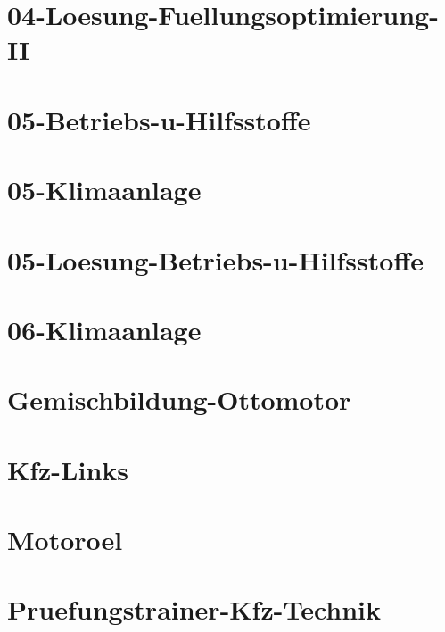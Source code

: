 \chapter{04-Loesung-Fuellungsoptimierung-II}
%
\chapter{05-Betriebs-u-Hilfsstoffe}
%
\chapter{05-Klimaanlage}
%
\chapter{05-Loesung-Betriebs-u-Hilfsstoffe}
%
\chapter{06-Klimaanlage}
%
\chapter{Gemischbildung-Ottomotor}
%
\chapter{Kfz-Links}
%
\chapter{Motoroel}
%
\chapter{Pruefungstrainer-Kfz-Technik}
%



%
%

